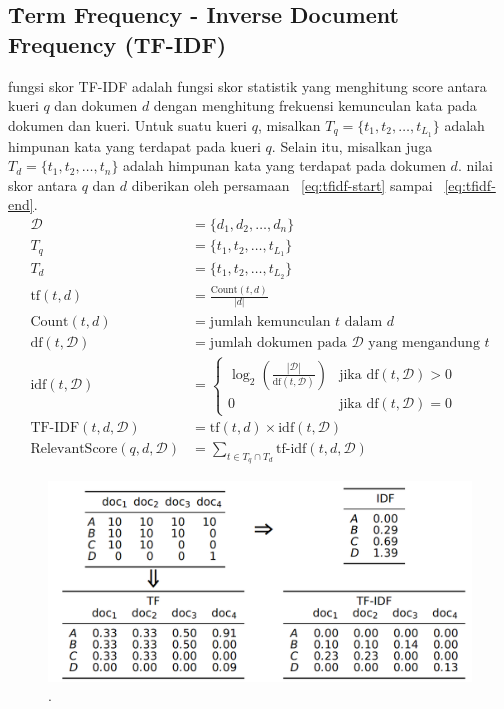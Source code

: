     \subsection{\f{Term Frequency - Inverse Document Frequency} (TF-IDF)}
    \label{sec:tfidf}
 
    fungsi skor TF-IDF adalah fungsi skor statistik yang menghitung $\text{score}$ antara kueri $q$ dan dokumen $d$ dengan menghitung frekuensi kemunculan kata pada dokumen dan kueri. Untuk suatu kueri $q$, misalkan $T_q= \{t_1, t_2, \dots, t_{L_1}\}$ adalah himpunan kata yang terdapat pada kueri $q$. Selain itu, misalkan juga $T_d = \{t_1, t_2, \dots, t_n\}$ adalah himpunan kata yang terdapat pada dokumen $d$. nilai skor antara $q$ dan $d$ diberikan oleh persamaan \equ~\ref{eq:tfidf-start} sampai \equ~\ref{eq:tfidf-end}.
    \begin{align}
        \label{eq:tfidf-start}
        \mathcal{D} &= \{d_1, d_2, \dots, d_n\} \\
        T_q &= \{t_1, t_2, \dots, t_{L_1}\} \\
        T_d &= \{t_1, t_2, \dots, t_{L_2}\} \\
        \text{tf}(t, d) &= \frac{\text{Count}(t, d)}{|d|} \\
        \text{Count}(t, d) &= \text{jumlah kemunculan } t \text{ dalam } d \\
        \text{df}(t, \mathcal{D}) &= \text{jumlah dokumen pada } \mathcal{D} \text{ yang mengandung } t \\
        \text{idf}(t, \mathcal{D}) &= \begin{cases}
            \log_2\left(\frac{|\mathcal{D}|}{\text{df}(t, \mathcal{D})}\right) & \text{jika } \text{df}(t, \mathcal{D}) > 0 \\
            0 & \text{jika } \text{df}(t, \mathcal{D}) = 0
        \end{cases} \\
        \label{eq:tf-idf-weight}
        \text{TF-IDF}(t, d, \mathcal{D}) &= \text{tf}(t, d) \times \text{idf}(t, \mathcal{D}) \\
        \label{eq:tfidf-end}
        \text{RelevantScore}(q,d,\mathcal{D}) &= \sum_{t \in T_q \cap T_d} \text{tf-idf}(t, d, \mathcal{D})
    \end{align}

    \begin{figure}
        \centering
        \includegraphics[width=1\textwidth]{assets/pics/tf-idf-matriks.png}
        \caption{\license.}
        \label{fig:tf-idf-matriks}
    \end{figure}

